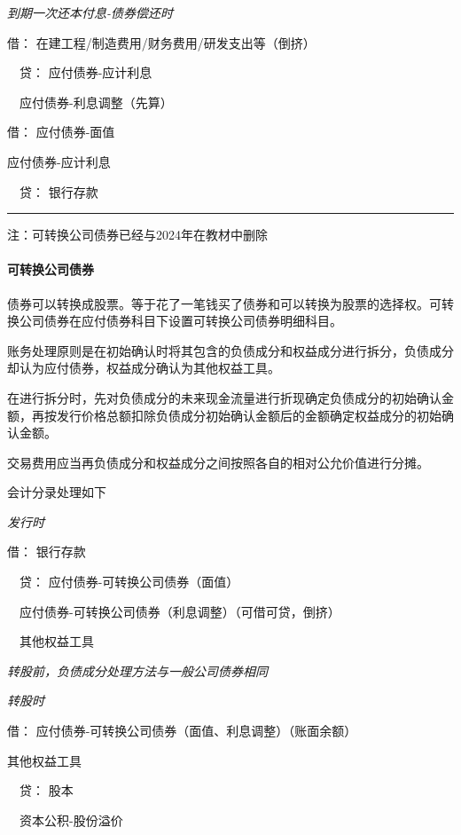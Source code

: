 \documentclass[UTF8,12pt]{ctexart}
\newenvironment{Dr}{\noindent 借：}{\par}
\newenvironment{Cr}{\noindent \ \ 贷：}{\par}
\numberwithin{equation}{section} %
\numberwithin{figure}{section}
\numberwithin{table}{section}
\begin{document}
	\textit{到期一次还本付息-债券偿还时}
	
	\begin{Dr}
		在建工程/制造费用/财务费用/研发支出等（倒挤）
	\end{Dr}
	\begin{Cr}
		应付债券-应计利息
		
		\ \ 应付债券-利息调整（先算）
	\end{Cr}
	
	\begin{Dr}
		应付债券-面值
		
		应付债券-应计利息
	\end{Dr}
	\begin{Cr}
		银行存款
	\end{Cr}

	
	\vspace{5pt}
	\hrule
	\vspace{5pt}
	注：可转换公司债券已经与2024年在教材中删除

	\paragraph{可转换公司债券}
	债券可以转换成股票。等于花了一笔钱买了债券和可以转换为股票的选择权。可转换公司债券在应付债券科目下设置可转换公司债券明细科目。
	
	账务处理原则是在初始确认时将其包含的负债成分和权益成分进行拆分，负债成分却认为应付债券，权益成分确认为其他权益工具。
	
	在进行拆分时，先对负债成分的未来现金流量进行折现确定负债成分的初始确认金额，再按发行价格总额扣除负债成分初始确认金额后的金额确定权益成分的初始确认金额。
	
	交易费用应当再负债成分和权益成分之间按照各自的相对公允价值进行分摊。
	
	会计分录处理如下
	
	\textit{发行时}
	
	\begin{Dr}
		银行存款
	\end{Dr}
	\begin{Cr}
		应付债券-可转换公司债券（面值）
		
		\ \ 应付债券-可转换公司债券（利息调整）（可借可贷，倒挤）
		
		\ \ 其他权益工具
	\end{Cr}

	\textit{转股前，负债成分处理方法与一般公司债券相同}
	
	\textit{转股时}
	
	\begin{Dr}
		应付债券-可转换公司债券（面值、利息调整）（账面余额）
		
		其他权益工具
	\end{Dr}
	\begin{Cr}
		股本
		
		\ \ 资本公积-股份溢价
	\end{Cr}
\end{document}
